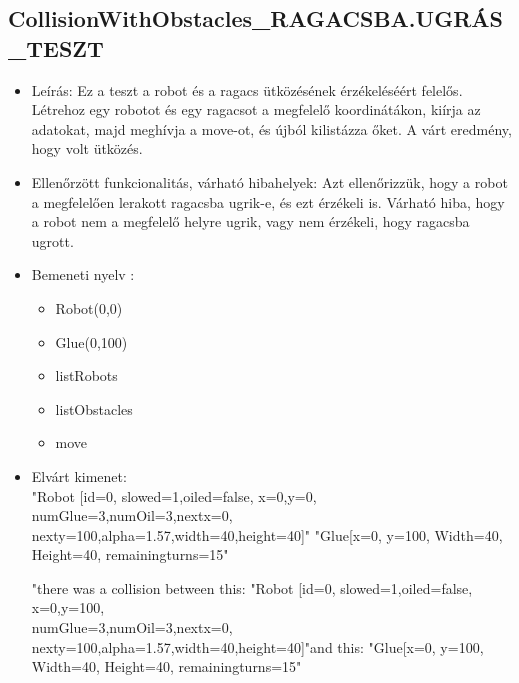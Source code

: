 \subsection{CollisionWithObstacles\_RAGACSBA.UGRÁS\_TESZT}
\begin{itemize}
	\item Leírás: Ez a teszt a robot és a ragacs ütközésének érzékeléséért felelős.
	                Létrehoz egy robotot és egy ragacsot a megfelelő koordinátákon, kiírja az adatokat, majd meghívja a move-ot, és újból kilistázza őket. A várt eredmény, hogy volt ütközés.
\newline
	\item  Ellenőrzött funkcionalitás, várható hibahelyek: Azt ellenőrizzük, hogy a robot a megfelelően lerakott ragacsba ugrik-e, és ezt érzékeli is.
		   Várható hiba, hogy a robot nem a megfelelő helyre ugrik, vagy nem érzékeli, hogy ragacsba ugrott.
	\item Bemeneti nyelv :
		\begin{itemize}
		\item Robot(0,0)
		\item Glue(0,100)
		\item listRobots
		\item listObstacles
		\item move
		\end{itemize}
	
	\item Elvárt kimenet: \\
		"Robot [id=0,  slowed=1,oiled=false, x=0,y=0, 
		\\numGlue=3,numOil=3,nextx=0,
		\\nexty=100,alpha=1.57,width=40,height=40]"\newline
		"Glue[x=0, y=100, Width=40, Height=40, remainingturns=15"\newline
		
		"there was a collision between this: "Robot [id=0,  slowed=1,oiled=false, x=0,y=100, 
		\\numGlue=3,numOil=3,nextx=0,
		\\nexty=100,alpha=1.57,width=40,height=40]"\newline and this: "Glue[x=0, y=100, Width=40, Height=40, remainingturns=15"\newline
\end{itemize}

\pagebreak
